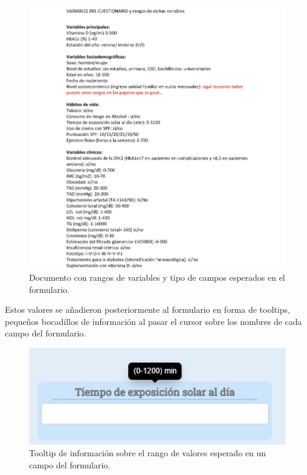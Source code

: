 \begin{figure}[h]
    \centering
     \includegraphics[width=1\textwidth]{images/rangosVariables.jpg}
    \caption{Documento con rangos de variables y tipo de campos esperados en el formulario.}
\end{figure}
\newpage

Estos valores se añadieron posteriormente al formulario en forma de tooltips, pequeños bocadillos de información al pasar el cursor sobre los nombres de cada campo del formulario.

\begin{figure}[h]
    \centering
     \includegraphics[width=1\textwidth]{images/tooltip.jpg}
    \caption{Tooltip de información sobre el rango de valores esperado en un campo del formulario.}
\end{figure}

